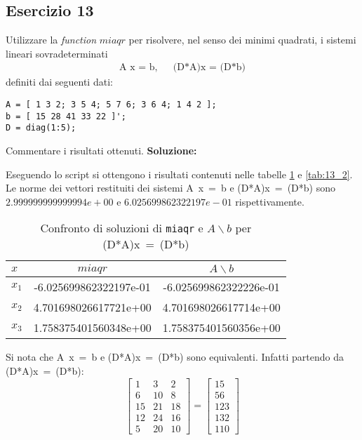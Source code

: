 \subsection{Esercizio 13}
Utilizzare la \textit{function} $miaqr$ per risolvere, nel senso dei minimi quadrati,
i sistemi lineari sovradeterminati
\begin{eqnarray*}
   \mbox{A x = b,} & & \mbox{(D*A)x = (D*b)}
\end{eqnarray*}
definiti dai seguenti dati:
\begin{lstlisting}
A = [ 1 3 2; 3 5 4; 5 7 6; 3 6 4; 1 4 2 ];
b = [ 15 28 41 33 22 ]';
D = diag(1:5);
\end{lstlisting}
Commentare i risultati ottenuti.
\newline \textbf{Soluzione:}

Eseguendo lo script  si ottengono i risultati contenuti nelle
tabelle \ref{tab:13_1} e \ref{tab:13_2}. Le norme dei vettori restituiti dei
sistemi \mbox{A x = b} e \mbox{(D*A)x = (D*b)} sono $2.999999999999994e+00$ e
$6.025699862322197e-01$ rispettivamente.
\begin{table}[ht]
   \centering
   \renewcommand\arraystretch{2}
   \begin{tabular}{|l | c c |}
      \hline
      $x$     & $miaqr$                & $A \backslash b$       \\
      \hline
      $x_{1}$ & -6.025699862322197e-01 & -6.025699862322226e-01 \\
      $x_{2}$ & 4.701698026617721e+00  & 4.701698026617714e+00  \\
      $x_{3}$ & 1.758375401560348e+00  & 1.758375401560356e+00  \\
      \hline
   \end{tabular}
   \caption{Confronto di soluzioni di \lstinline{miaqr} e $A \backslash b$ per \mbox{(D*A)x = (D*b)}}
   \label{tab:13_1}
\end{table}
\FloatBarrier
Si nota che \mbox{A x = b} e \mbox{(D*A)x = (D*b)} sono equivalenti.
Infatti partendo da \mbox{(D*A)x = (D*b)}:
\[
   \begin{bmatrix}
      1  & 3  & 2  \\
      6  & 10 & 8  \\
      15 & 21 & 18 \\
      12 & 24 & 16 \\
      5  & 20 & 10
   \end{bmatrix}
   =
   \begin{bmatrix}
      15  \\
      56  \\
      123 \\
      132 \\
      110
   \end{bmatrix}
\]
